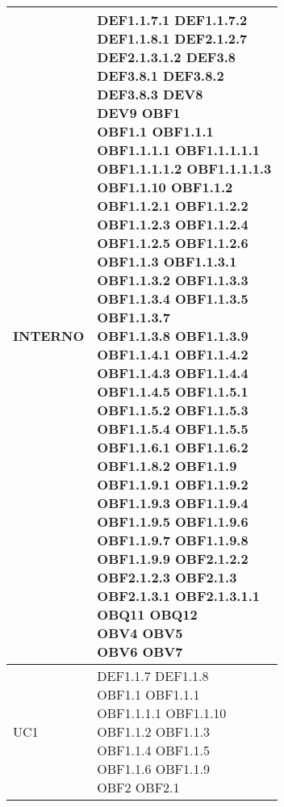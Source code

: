 \documentclass{scalatekids-article}
\begin{document}
\begin{longtable}[H]{|p{5.5cm}|p{5.5cm}|}
  INTERNO & \multiLineCell[t]{DEF1.1.7.1 DEF1.1.7.2\\DEF1.1.8.1 DEF2.1.2.7\\DEF2.1.3.1.2 DEF3.8\\DEF3.8.1 DEF3.8.2\\DEF3.8.3 DEV8\\DEV9 OBF1\\OBF1.1 OBF1.1.1\\OBF1.1.1.1 OBF1.1.1.1.1\\OBF1.1.1.1.2 OBF1.1.1.1.3\\OBF1.1.10 OBF1.1.2\\OBF1.1.2.1 OBF1.1.2.2\\OBF1.1.2.3 OBF1.1.2.4\\OBF1.1.2.5 OBF1.1.2.6\\OBF1.1.3 OBF1.1.3.1\\OBF1.1.3.2 OBF1.1.3.3\\OBF1.1.3.4 OBF1.1.3.5\\OBF1.1.3.7\\OBF1.1.3.8 OBF1.1.3.9\\OBF1.1.4.1 OBF1.1.4.2\\OBF1.1.4.3 OBF1.1.4.4\\OBF1.1.4.5 OBF1.1.5.1\\OBF1.1.5.2 OBF1.1.5.3\\OBF1.1.5.4 OBF1.1.5.5\\OBF1.1.6.1 OBF1.1.6.2\\OBF1.1.8.2 OBF1.1.9\\OBF1.1.9.1 OBF1.1.9.2\\OBF1.1.9.3 OBF1.1.9.4\\OBF1.1.9.5 OBF1.1.9.6\\OBF1.1.9.7 OBF1.1.9.8\\OBF1.1.9.9 OBF2.1.2.2\\OBF2.1.2.3 OBF2.1.3\\OBF2.1.3.1 OBF2.1.3.1.1\\OBQ11 OBQ12\\OBV4 OBV5\\OBV6 OBV7\\}\\
  \hline
  UC1 & \multiLineCell[t]{DEF1.1.7 DEF1.1.8\\OBF1.1 OBF1.1.1\\OBF1.1.1.1 OBF1.1.10\\OBF1.1.2 OBF1.1.3\\OBF1.1.4 OBF1.1.5\\OBF1.1.6 OBF1.1.9\\OBF2 OBF2.1\\}\\

\end{longtable}
\end{document}

